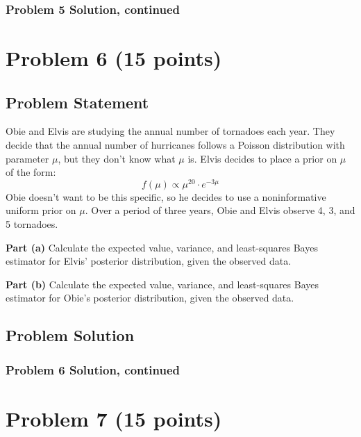 \documentclass[12pt]{article}
\theoremstyle{definition}
\begin{document}
\newpage
\subsubsection*{Problem 5 Solution, continued}


\newpage
\section*{Problem 6 (15 points)}

\subsection*{Problem Statement}

Obie and Elvis are studying the annual number of tornadoes each year. They decide that the annual number of hurricanes follows a Poisson distribution with parameter $\mu$, but they don't know what $\mu$ is. Elvis decides to place a prior on $\mu$ of the form:
$$
f(\mu) \propto \mu^{20} \cdot e^{-3 \mu}
$$
Obie doesn't want to be this specific, so he decides to use a noninformative uniform prior on $\mu$. Over a period of three years, Obie and Elvis observe 4, 3, and 5 tornadoes.

\bigskip
\noindent
{\bf Part (a)} Calculate the expected value, variance, and least-squares Bayes estimator for Elvis' posterior distribution, given the observed data.

\bigskip
\noindent
{\bf Part (b)} Calculate the expected value, variance, and least-squares Bayes estimator for Obie's posterior distribution, given the observed data.





\subsection*{Problem Solution}


\newpage
\subsubsection*{Problem 6 Solution, continued}








\newpage
\section*{Problem 7 (15 points)}
\end{document}
